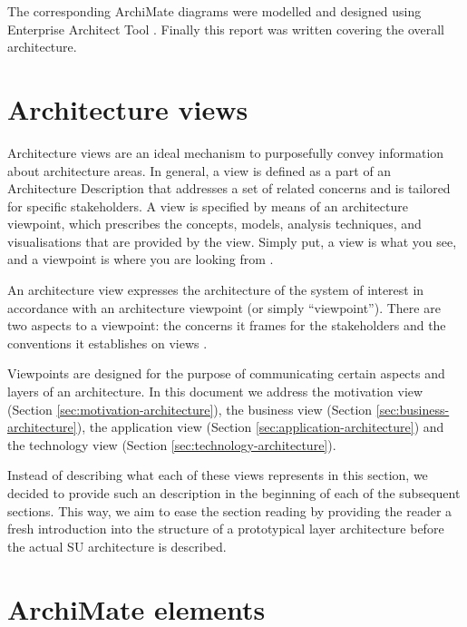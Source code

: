 	 The corresponding ArchiMate diagrams were modelled and designed using Enterprise Architect Tool \citep{ea}. Finally this report was written covering the overall architecture. 
	
	\section{Architecture views}
	\label{sec:views}
	
	
	Architecture views are an ideal mechanism to purposefully convey information about architecture areas. In general, a view is defined as a part of an Architecture Description that addresses a set of related concerns and is tailored for specific stakeholders. A view is specified by means of an architecture viewpoint, which prescribes the concepts, models, analysis techniques, and visualisations that are provided by the view. Simply put, a view is what you see, and a viewpoint is where you are looking from \citep{archimate3.1}.
	
	An architecture view expresses the architecture of the system of interest in accordance with an architecture viewpoint (or simply ``viewpoint''). There are two aspects to a viewpoint: the concerns it frames for the stakeholders and the conventions it establishes on views \citep{archimate3.1}.

	Viewpoints are designed for the purpose of communicating certain aspects and layers of an architecture. In this document we address the motivation view (Section \ref{sec:motivation-architecture}), the business view (Section \ref{sec:business-architecture}), the application view (Section \ref{sec:application-architecture}) and the technology view (Section \ref{sec:technology-architecture}).
	
	Instead of describing what each of these views represents in this section, we decided to provide such an description in the beginning of each of the subsequent sections. This way, we aim to ease the section reading by providing the reader a fresh introduction into the structure of a prototypical layer architecture before the actual SU architecture is described.
	
	\section{ArchiMate elements}
	
